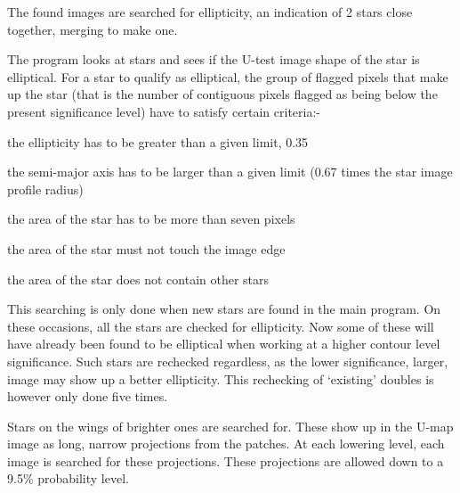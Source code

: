 \begin{small}
{{ \vspace*{1mm}
 \hspace*{2em}{\bf Ellipticity}
 \vspace*{1mm}


 The found images are searched for ellipticity, an indication of 2
 stars close together, merging to make one.

 The program looks at stars and sees if the U-test image shape of the
 star is elliptical. For a star to qualify as elliptical, the
 group of flagged pixels that make up the star (that is the number
 of contiguous pixels flagged as being below the present
 significance level) have to satisfy certain criteria:-

\begin{list}{{-}}{}

    \item  the ellipticity has to be greater than a given limit, 0.35
    \item  the semi-major axis has to be larger than a given limit
              (0.67 times the star image profile radius)
    \item  the area of the star has to be more than seven pixels
    \item  the area of the star must not touch the image edge
    \item  the area of the star does not contain other stars
\end{list}

 This searching is only done when new stars are found in the main
 program. On these occasions, all the stars are checked for
 ellipticity. Now some of these will have already been found
 to be elliptical when working at a higher contour level
 significance. Such stars are rechecked regardless, as the lower
 significance, larger, image may show up a better ellipticity. This
 rechecking of `existing' doubles is however only done five times.

 \vspace*{1mm}
 \hspace*{2em}{\bf Shoulders}
 \vspace*{1mm}

  Stars on the wings of brighter ones are searched for. These show up
  in the U-map image as long, narrow projections from the patches. At
  each lowering level, each image is searched for these projections.
  These projections are allowed down to a 9.5\% probability level.

 \vspace*{1mm}
 \hspace*{2em}{\bf Weeding}
 \vspace*{1mm}

}}
\end{small}
